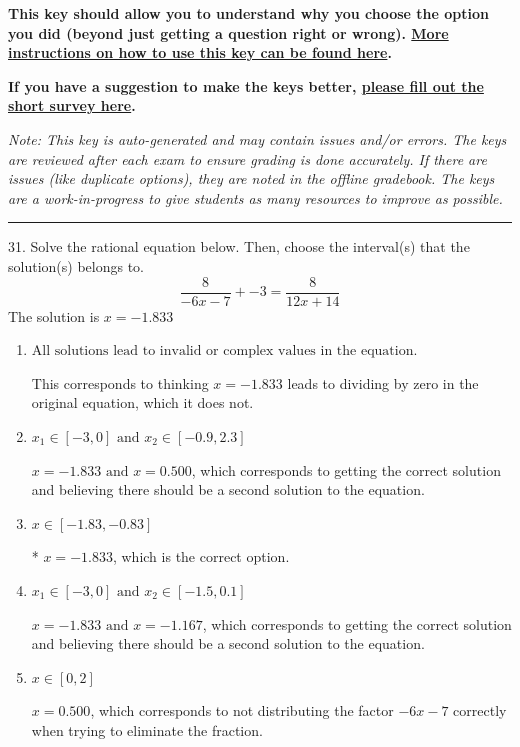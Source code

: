 \documentclass{article}[14pt]
\begin{document}
\textbf{This key should allow you to understand why you choose the option you did (beyond just getting a question right or wrong). \href{https://xronos.clas.ufl.edu/mac1105spring2020/courseDescriptionAndMisc/Exams/LearningFromResults}{More instructions on how to use this key can be found here}.}

\textbf{If you have a suggestion to make the keys better, \href{https://forms.gle/CZkbZmPbC9XALEE88}{please fill out the short survey here}.}

\textit{Note: This key is auto-generated and may contain issues and/or errors. The keys are reviewed after each exam to ensure grading is done accurately. If there are issues (like duplicate options), they are noted in the offline gradebook. The keys are a work-in-progress to give students as many resources to improve as possible.}

\rule{\textwidth}{0.4pt}

31. Solve the rational equation below. Then, choose the interval(s) that the solution(s) belongs to.
$$ \frac{8}{-6x -7} + -3 = \frac{8}{12x + 14} $$ 
The solution is $ x = -1.833 $ 

\begin{enumerate}[label=\Alph*.] 
\item $ \text{All solutions lead to invalid or complex values in the equation.} $ 

 This corresponds to thinking $x = -1.833$ leads to dividing by zero in the original equation, which it does not. 
\item $ x_1 \in [-3, 0] \text{ and } x_2 \in [-0.9,2.3] $ 

 $x = -1.833 \text{ and } x = 0.500$, which corresponds to getting the correct solution and believing there should be a second solution to the equation. 
\item $ x \in [-1.83,-0.83] $ 

 * $x = -1.833$, which is the correct option. 
\item $ x_1 \in [-3, 0] \text{ and } x_2 \in [-1.5,0.1] $ 

 $x = -1.833 \text{ and } x = -1.167$, which corresponds to getting the correct solution and believing there should be a second solution to the equation. 
\item $ x \in [0,2] $ 

 $x = 0.500$, which corresponds to not distributing the factor $-6x -7$ correctly when trying to eliminate the fraction. 
\end{enumerate} 
 
\end{document}
